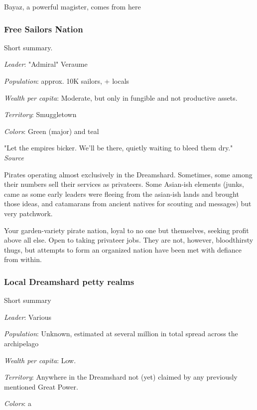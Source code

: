 Bayaz, a powerful magister, comes from here


\subsubsection{Free Sailors Nation}

Short summary.

\textit{Leader}: "Admiral" Veraume

\textit{Population}: approx. 10K sailors, + locals

\textit{Wealth per capita}: Moderate, but only in fungible and not productive assets.

\textit{Territory}: Smuggletown
    
\textit{Colors}: Green (major) and teal

\begin{rpg-quotebox}
    "Let the empires bicker. We'll be there, quietly waiting to bleed them dry." \\ \textendash \textit{Source}
\end{rpg-quotebox}


Pirates operating almost exclusively in the Dreamshard. Sometimes, some among their numbers sell their services as privateers. Some Asian-ish elements (junks, came as some early leaders were fleeing from the asian-ish lands and brought those ideas, and catamarans from ancient natives for scouting and messages) but very patchwork. 
	
Your garden-variety pirate nation, loyal to no one but themselves, seeking profit above all else. Open to taking privateer jobs. They are not, however, bloodthirsty thugs, but attempts to form an organized nation have been met with defiance from within.




\subsubsection{Local Dreamshard petty realms}


Short summary

\textit{Leader}: Various

\textit{Population}: Unknown, estimated at several million in total spread across the archipelago

\textit{Wealth per capita}: Low.

\textit{Territory}: Anywhere in the Dreamshard not (yet) claimed by any previously mentioned Great Power.
    
\textit{Colors}: a


